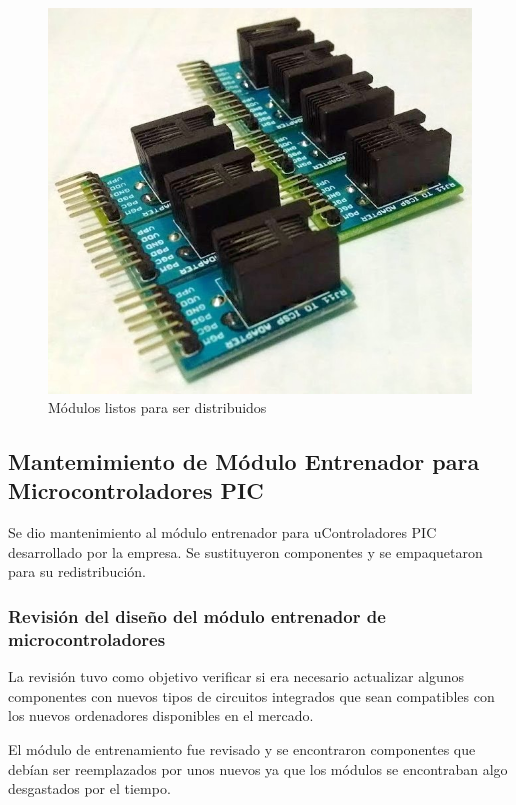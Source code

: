 \begin{figure}[h!]
  \centering
  \includegraphics[scale=0.36]{images/activities/adaptador_rj11_icsp/modulos-dspic.jpg}
  \caption{Módulos listos para ser distribuidos}
  \label{fig:modulos-dspic}
\end{figure}

\clearpage

\subsection{Mantemimiento de Módulo Entrenador para Microcontroladores PIC}
Se dio mantenimiento al módulo entrenador para uControladores PIC desarrollado por la empresa. Se sustituyeron componentes y se empaquetaron para su redistribución.

\subsubsection{Revisión del diseño del módulo entrenador de microcontroladores}
La revisión tuvo como objetivo verificar si era necesario actualizar algunos componentes con nuevos tipos de circuitos integrados que sean compatibles con los nuevos ordenadores disponibles en el mercado.

El módulo de entrenamiento fue revisado y se encontraron componentes que debían ser reemplazados por unos nuevos ya que los módulos se encontraban algo desgastados por el tiempo.

